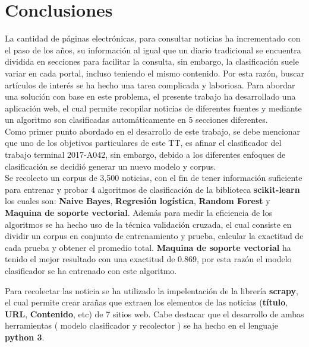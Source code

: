 \section{Conclusiones}

La cantidad de páginas electrónicas, para consultar noticias ha incrementado con el paso de los años, su información al igual que un diario tradicional se encuentra dividida en secciones para facilitar 
la consulta, sin embargo, la clasificación suele variar en cada portal, incluso teniendo el mismo contenido. Por esta razón, buscar artículos de interés se ha hecho una tarea complicada y laboriosa. Para abordar una solución con base en este problema, el presente trabajo ha desarrollado
una aplicación web, el cual permite recopilar noticias de diferentes fuentes y mediante un algoritmo son clasificadas automáticamente en 5 secciones diferentes.\\


Como primer punto abordado en el desarrollo de este trabajo, se debe mencionar que uno de los objetivos particulares de este TT, es afinar el clasificador del trabajo terminal 2017-A042, sin embargo, debido a los diferentes enfoques de clasificación se decidió generar un nuevo modelo y corpus.\\ 

Se recolecto un corpus de 3,500 noticias, con el fin de tener información suficiente para entrenar y probar 4 algoritmos de clasificación de la biblioteca \textbf{scikit-learn} los cuales son: \textbf{Naive Bayes}, \textbf{Regresión logística}, \textbf{Random Forest} y \textbf{Maquina de soporte vectorial}. Además para medir la eficiencia de los algoritmos se ha hecho uso de la técnica validación cruzada, el cual consiste en dividir un corpus en conjunto de entrenamiento y prueba, calcular la exactitud de cada prueba y obtener el promedio total. \textbf{Maquina de soporte vectorial} ha tenido el mejor resultado con una exactitud de 0.869, por esta razón el modelo clasificador se ha entrenado con este algoritmo. 

Para recolectar las noticia se ha utilizado la impelentación de la librería \textbf{scrapy}, el cual permite crear arañas que extraen los elementos de las noticias (\textbf{título}, \textbf{URL}, \textbf{Contenido}, etc) de 7 sitios web. Cabe destacar que el desarrollo de ambas herramientas ( modelo clasificador y recolector ) se ha hecho en el lenguaje \textbf{python 3}.\\


